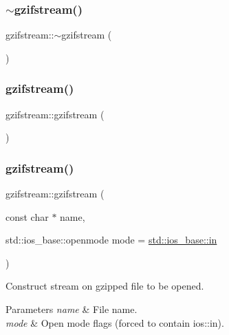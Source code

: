 \subsubsection{\texorpdfstring{$\sim$gzifstream()}{~gzifstream()}}
{\footnotesize\ttfamily gzifstream\+::$\sim$gzifstream (\begin{DoxyParamCaption}{ }\end{DoxyParamCaption})\hspace{0.3cm}{\ttfamily [virtual]}}

\mbox{\label{classgzifstream_a6fa19ba2a1eeaeab5f0a408082bc2edd}} 
\subsubsection{\texorpdfstring{gzifstream()}{gzifstream()}\hspace{0.1cm}{\footnotesize\ttfamily [4/6]}}
{\footnotesize\ttfamily gzifstream\+::gzifstream (\begin{DoxyParamCaption}{ }\end{DoxyParamCaption})}

\mbox{\label{classgzifstream_a90f6e0eea83b7ce3c64f755b51b5b011}} 
\subsubsection{\texorpdfstring{gzifstream()}{gzifstream()}\hspace{0.1cm}{\footnotesize\ttfamily [5/6]}}
{\footnotesize\ttfamily gzifstream\+::gzifstream (\begin{DoxyParamCaption}\item[{const char $\ast$}]{name,  }\item[{std\+::ios\+\_\+base\+::openmode}]{mode = {\ttfamily \mbox{\hyperlink{gun_8c_a8bab68b4d22f69428207fabb60dc4f5c}{std\+::ios\+\_\+base\+::in}}} }\end{DoxyParamCaption})\hspace{0.3cm}{\ttfamily [explicit]}}



Construct stream on gzipped file to be opened. 


\begin{DoxyParams}{Parameters}
{\em name} & File name. \\
\hline
{\em mode} & Open mode flags (forced to contain ios\+::in). \\
\hline
\end{DoxyParams}
\mbox{\label{classgzifstream_aa5ab9dcc3ab35bffe781f4c49239826e}} 
